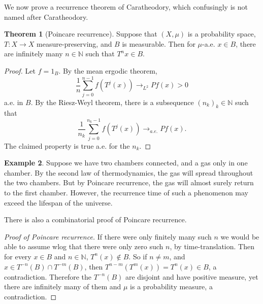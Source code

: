 \documentclass[12pt]{report}
\newcommand{\NN}{\mathbb{N}}
\theoremstyle{definition}
\newtheorem{theorem}{Theorem}[chapter]
\newtheorem{example}[theorem]{Example}
\begin{document}
We now prove a recurrence theorem of Caratheodory, which confusingly is not named after Caratheodory.
\begin{theorem}[Poincare recurrence]
Suppose that $(X, \mu)$ is a probability space, $T: X \to X$ measure-preserving, and $B$ is measurable. Then for $\mu$-a.e. $x \in B$, there are infinitely many $n \in \NN$ such that $T^nx \in B$.
\end{theorem}
\begin{proof}
Let $f = 1_B$. By the mean ergodic theorem,
$$\frac{1}{n}\sum_{j=0}^{n-1} f(T^j(x)) \to_{L^2} Pf(x) > 0$$
a.e. in $B$. By the Riesz-Weyl theorem, there is a subsequence $(n_k)_k \in \NN$ such that
$$\frac{1}{n_k} \sum_{j=0}^{n_k-1} f(T^j(x)) \to_{a.e.} Pf(x).$$
The claimed property is true a.e. for the $n_k$.
\end{proof}
\begin{example}
Suppose we have two chambers connected, and a gas only in one chamber. By the second law of thermodynamics, the gas will spread throughout the two chambers. But by Poincare recurrence, the gas will almost surely return to the first chamber. However, the recurrence time of such a phenomenon may exceed the lifespan of the universe.
\end{example}
There is also a combinatorial proof of Poincare recurrence.
\begin{proof}[Proof of Poincare recurrence]
If there were only finitely many such $n$ we would be able to assume wlog that there were only zero such $n$, by time-translation. Then for every $x \in B$ and $n \in \NN$, $T^n(x) \notin B$. So if $n \neq m$, and $x \in T^{-n}(B) \cap T^{-m}(B)$, then $T^{n-m}(T^m(x)) = T^n(x) \in B$, a contradiction. Therefore the $T^{-n}(B)$ are disjoint and have positive measure, yet there are infinitely many of them and $\mu$ is a probability measure, a contradiction.
\end{proof}
\end{document}
